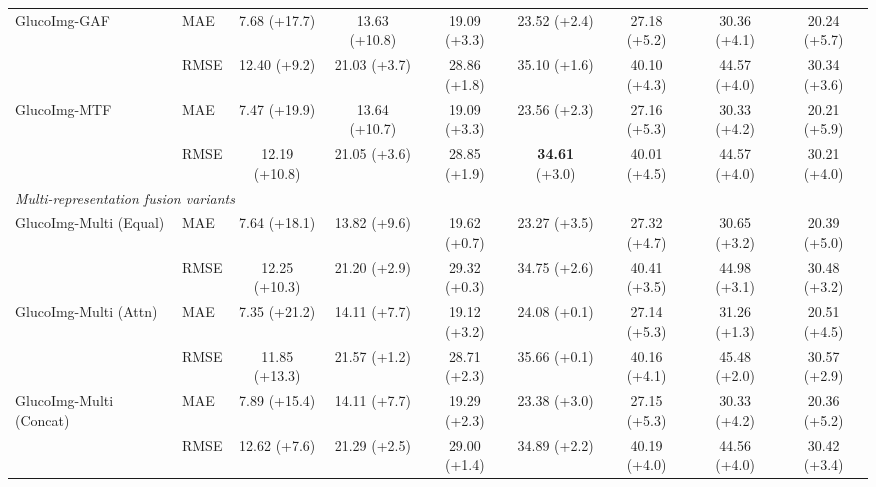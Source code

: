 \begin{table}[t]
{\begin{tabular}{llccccccc}
\multirow{2}{*}{GlucoImg-GAF}
& MAE
& 7.68 {\scriptsize (+17.7)}
& 13.63 {\scriptsize (+10.8)}
& 19.09 {\scriptsize (+3.3)}
& 23.52 {\scriptsize (+2.4)}
& 27.18 {\scriptsize (+5.2)}
& 30.36 {\scriptsize (+4.1)}
& 20.24 {\scriptsize (+5.7)} \\
& RMSE
& 12.40 {\scriptsize (+9.2)}
& 21.03 {\scriptsize (+3.7)}
& 28.86 {\scriptsize (+1.8)}
& 35.10 {\scriptsize (+1.6)}
& 40.10 {\scriptsize (+4.3)}
& 44.57 {\scriptsize (+4.0)}
& 30.34 {\scriptsize (+3.6)} \\

\multirow{2}{*}{GlucoImg-MTF}
& MAE
& 7.47 {\scriptsize (+19.9)}
& 13.64 {\scriptsize (+10.7)}
& 19.09 {\scriptsize (+3.3)}
& 23.56 {\scriptsize (+2.3)}
& 27.16 {\scriptsize (+5.3)}
& 30.33 {\scriptsize (+4.2)}
& 20.21 {\scriptsize (+5.9)} \\
& RMSE
& 12.19 {\scriptsize (+10.8)}
& 21.05 {\scriptsize (+3.6)}
& 28.85 {\scriptsize (+1.9)}
& \textbf{34.61} {\scriptsize (+3.0)}
& 40.01 {\scriptsize (+4.5)}
& 44.57 {\scriptsize (+4.0)}
& 30.21 {\scriptsize (+4.0)} \\

\midrule
\multicolumn{9}{l}{\textit{Multi-representation fusion variants}} \\
\midrule

\multirow{2}{*}{GlucoImg-Multi (Equal)}
& MAE
& 7.64 {\scriptsize (+18.1)}
& 13.82 {\scriptsize (+9.6)}
& 19.62 {\scriptsize (+0.7)}
& 23.27 {\scriptsize (+3.5)}
& 27.32 {\scriptsize (+4.7)}
& 30.65 {\scriptsize (+3.2)}
& 20.39 {\scriptsize (+5.0)} \\
& RMSE
& 12.25 {\scriptsize (+10.3)}
& 21.20 {\scriptsize (+2.9)}
& 29.32 {\scriptsize (+0.3)}
& 34.75 {\scriptsize (+2.6)}
& 40.41 {\scriptsize (+3.5)}
& 44.98 {\scriptsize (+3.1)}
& 30.48 {\scriptsize (+3.2)} \\

\multirow{2}{*}{GlucoImg-Multi (Attn)}
& MAE
& 7.35 {\scriptsize (+21.2)}
& 14.11 {\scriptsize (+7.7)}
& 19.12 {\scriptsize (+3.2)}
& 24.08 {\scriptsize (+0.1)}
& 27.14 {\scriptsize (+5.3)}
& 31.26 {\scriptsize (+1.3)}
& 20.51 {\scriptsize (+4.5)} \\
& RMSE
& 11.85 {\scriptsize (+13.3)}
& 21.57 {\scriptsize (+1.2)}
& 28.71 {\scriptsize (+2.3)}
& 35.66 {\scriptsize (+0.1)}
& 40.16 {\scriptsize (+4.1)}
& 45.48 {\scriptsize (+2.0)}
& 30.57 {\scriptsize (+2.9)} \\

\multirow{2}{*}{GlucoImg-Multi (Concat)}
& MAE
& 7.89 {\scriptsize (+15.4)}
& 14.11 {\scriptsize (+7.7)}
& 19.29 {\scriptsize (+2.3)}
& 23.38 {\scriptsize (+3.0)}
& 27.15 {\scriptsize (+5.3)}
& 30.33 {\scriptsize (+4.2)}
& 20.36 {\scriptsize (+5.2)} \\
& RMSE
& 12.62 {\scriptsize (+7.6)}
& 21.29 {\scriptsize (+2.5)}
& 29.00 {\scriptsize (+1.4)}
& 34.89 {\scriptsize (+2.2)}
& 40.19 {\scriptsize (+4.0)}
& 44.56 {\scriptsize (+4.0)}
& 30.42 {\scriptsize (+3.4)} \\


\end{tabular}}
\end{table}
